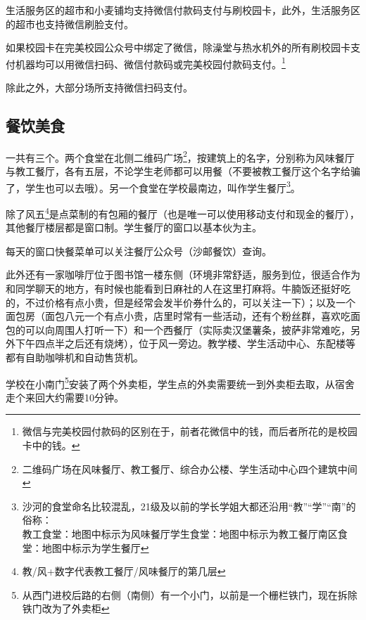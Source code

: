 
生活服务区的超市和小麦铺均支持微信付款码支付与刷校园卡，此外，生活服务区的超市也支持微信刷脸支付。

如果校园卡在完美校园公众号中绑定了微信，除澡堂与热水机外的所有刷校园卡支付机器均可以用微信扫码、微信付款码或完美校园付款码支付。\footnote{微信与完美校园付款码的区别在于，前者花微信中的钱，而后者所花的是校园卡中的钱。}

除此之外，大部分场所支持微信扫码支付。


\subsection{餐饮美食}


一共有三个。两个食堂在北侧二维码广场\footnote{二维码广场在风味餐厅、教工餐厅、综合办公楼、学生活动中心四个建筑中间}，按建筑上的名字，分别称为风味餐厅与教工餐厅，各有五层，不论学生老师都可以用餐（不要被教工餐厅这个名字给骗了，学生也可以去哦）。另一个食堂在学校最南边，叫作学生餐厅\footnote{沙河的食堂命名比较混乱，21级及以前的学长学姐大都还沿用“教”“学”“南”的俗称：\\\hspace*{3em}教工食堂：地图中标示为风味餐厅\hspace*{1em}学生食堂：地图中标示为教工餐厅\hspace*{1em}南区食堂：地图中标示为学生餐厅}。

除了风五\footnote{教/风+数字代表教工餐厅/风味餐厅的第几层}是点菜制的有包厢的餐厅（也是唯一可以使用移动支付和现金的餐厅），其他餐厅楼层都是窗口制。学生餐厅的窗口以基本伙为主。

每天的窗口快餐菜单可以关注餐厅公众号（沙邮餐饮）查询。

此外还有一家咖啡厅位于图书馆一楼东侧（环境非常舒适，服务到位，很适合作为和同学聊天的地方，有时候也能看到日麻社的人在这里打麻将。牛腩饭还挺好吃的，不过价格有点小贵，但是经常会发半价券什么的，可以关注一下）；以及一个面包房（面包八元一个有点小贵，店里时常有一些活动，还有个粉丝群，喜欢吃面包的可以向周围人打听一下）和一个西餐厅（实际卖汉堡薯条，披萨非常难吃，另外下午四点半之后还有烧烤），位于风一旁边。教学楼、学生活动中心、东配楼等都有自助咖啡机和自动售货机。


学校在小南门\footnote{从西门进校后路的右侧（南侧）有一个小门，以前是一个栅栏铁门，现在拆除铁门改为了外卖柜}安装了两个外卖柜，学生点的外卖需要统一到外卖柜去取，从宿舍走个来回大约需要10分钟。

